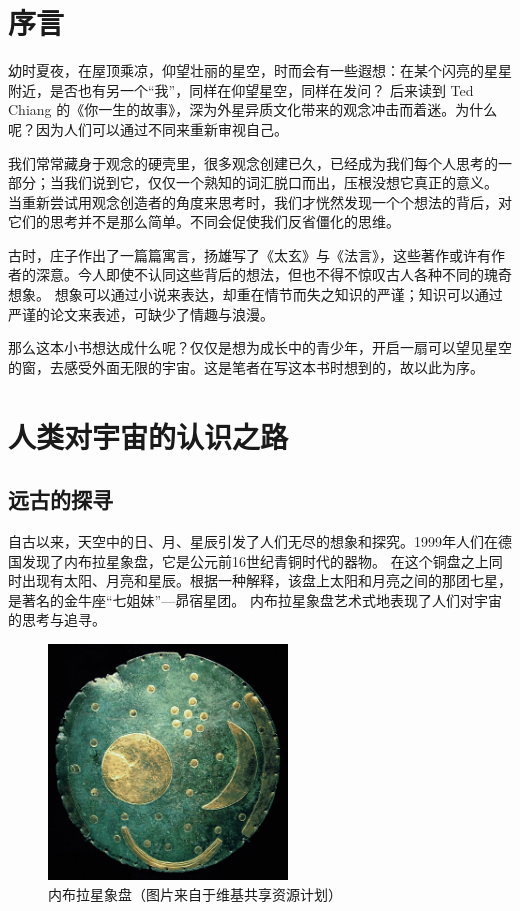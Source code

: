 \documentclass[a4paper,10.5pt]{article}
\begin{document}
\section{序言}

幼时夏夜，在屋顶乘凉，仰望壮丽的星空，时而会有一些遐想：在某个闪亮的星星附近，是否也有另一个“我”，同样在仰望星空，同样在发问？
后来读到 Ted Chiang 的《你一生的故事》，深为外星异质文化带来的观念冲击而着迷。为什么呢？因为人们可以通过不同来重新审视自己。

我们常常藏身于观念的硬壳里，很多观念创建已久，已经成为我们每个人思考的一部分；当我们说到它，仅仅一个熟知的词汇脱口而出，压根没想它真正的意义。
当重新尝试用观念创造者的角度来思考时，我们才恍然发现一个个想法的背后，对它们的思考并不是那么简单。不同会促使我们反省僵化的思维。

古时，庄子作出了一篇篇寓言，扬雄写了《太玄》与《法言》，这些著作或许有作者的深意。今人即使不认同这些背后的想法，但也不得不惊叹古人各种不同的瑰奇想象。
想象可以通过小说来表达，却重在情节而失之知识的严谨；知识可以通过严谨的论文来表述，可缺少了情趣与浪漫。

那么这本小书想达成什么呢？仅仅是想为成长中的青少年，开启一扇可以望见星空的窗，去感受外面无限的宇宙。这是笔者在写这本书时想到的，故以此为序。

\newpage

\section{人类对宇宙的认识之路}

\subsection{远古的探寻}

自古以来，天空中的日、月、星辰引发了人们无尽的想象和探究。1999年人们在德国发现了内布拉星象盘，它是公元前16世纪青铜时代的器物。
在这个铜盘之上同时出现有太阳、月亮和星辰。根据一种解释，该盘上太阳和月亮之间的那团七星，是著名的金牛座“七姐妹”—昴宿星团。
内布拉星象盘艺术式地表现了人们对宇宙的思考与追寻。

\begin{figure}[ht]
\centering
\includegraphics[width=2.5in]{images/1_01-Nebra_sky_disk.jpg}
\caption{内布拉星象盘（图片来自于维基共享资源计划）}
\end{figure}
\end{document}
